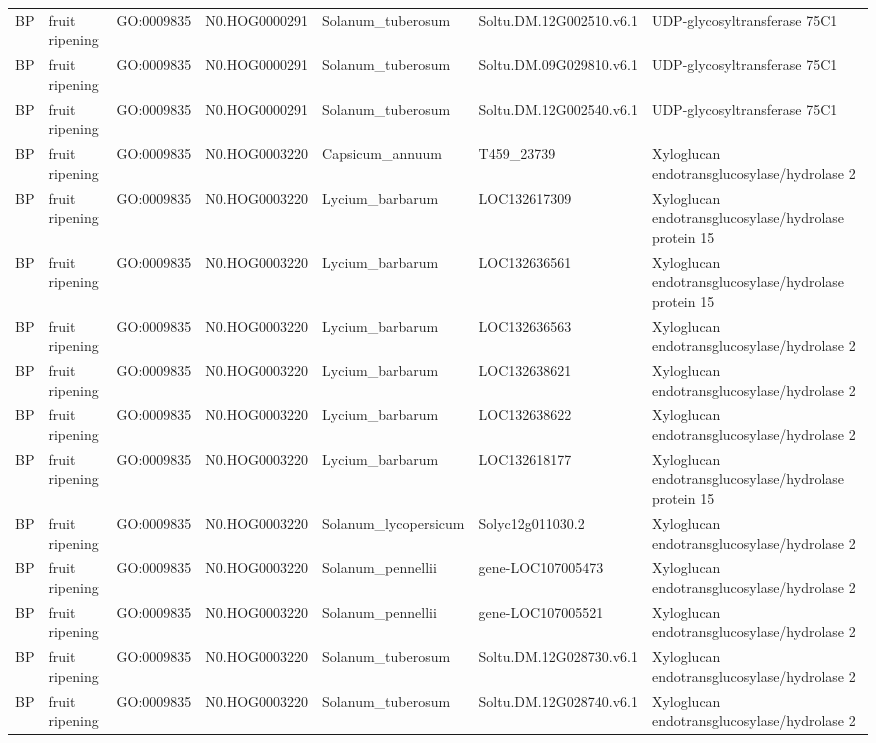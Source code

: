 \begin{table}
\begin{tabular}[t]{lllllll}
BP & fruit ripening & GO:0009835 & N0.HOG0000291 & Solanum\_tuberosum & Soltu.DM.12G002510.v6.1 & UDP-glycosyltransferase 75C1\\
BP & fruit ripening & GO:0009835 & N0.HOG0000291 & Solanum\_tuberosum & Soltu.DM.09G029810.v6.1 & UDP-glycosyltransferase 75C1\\
BP & fruit ripening & GO:0009835 & N0.HOG0000291 & Solanum\_tuberosum & Soltu.DM.12G002540.v6.1 & UDP-glycosyltransferase 75C1\\
BP & fruit ripening & GO:0009835 & N0.HOG0003220 & Capsicum\_annuum & T459\_23739 & Xyloglucan endotransglucosylase/hydrolase 2\\
BP & fruit ripening & GO:0009835 & N0.HOG0003220 & Lycium\_barbarum & LOC132617309 & Xyloglucan endotransglucosylase/hydrolase protein 15\\
BP & fruit ripening & GO:0009835 & N0.HOG0003220 & Lycium\_barbarum & LOC132636561 & Xyloglucan endotransglucosylase/hydrolase protein 15\\
BP & fruit ripening & GO:0009835 & N0.HOG0003220 & Lycium\_barbarum & LOC132636563 & Xyloglucan endotransglucosylase/hydrolase 2\\
BP & fruit ripening & GO:0009835 & N0.HOG0003220 & Lycium\_barbarum & LOC132638621 & Xyloglucan endotransglucosylase/hydrolase 2\\
BP & fruit ripening & GO:0009835 & N0.HOG0003220 & Lycium\_barbarum & LOC132638622 & Xyloglucan endotransglucosylase/hydrolase 2\\
BP & fruit ripening & GO:0009835 & N0.HOG0003220 & Lycium\_barbarum & LOC132618177 & Xyloglucan endotransglucosylase/hydrolase protein 15\\
BP & fruit ripening & GO:0009835 & N0.HOG0003220 & Solanum\_lycopersicum & Solyc12g011030.2 & Xyloglucan endotransglucosylase/hydrolase 2\\
BP & fruit ripening & GO:0009835 & N0.HOG0003220 & Solanum\_pennellii & gene-LOC107005473 & Xyloglucan endotransglucosylase/hydrolase 2\\
BP & fruit ripening & GO:0009835 & N0.HOG0003220 & Solanum\_pennellii & gene-LOC107005521 & Xyloglucan endotransglucosylase/hydrolase 2\\
BP & fruit ripening & GO:0009835 & N0.HOG0003220 & Solanum\_tuberosum & Soltu.DM.12G028730.v6.1 & Xyloglucan endotransglucosylase/hydrolase 2\\
BP & fruit ripening & GO:0009835 & N0.HOG0003220 & Solanum\_tuberosum & Soltu.DM.12G028740.v6.1 & Xyloglucan endotransglucosylase/hydrolase 2\\

\end{tabular}
\end{table}
